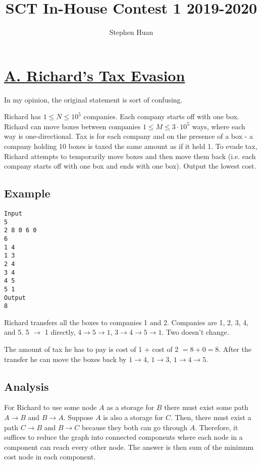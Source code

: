\documentclass[11pt, oneside]{article}
\title{SCT In-House Contest 1 2019-2020}
\author{Stephen Huan}
\begin{document}
\maketitle

\section{\href{https://codeforces.com/group/M4wsRWBHyZ/contest/259141/problem/A}{A. Richard's Tax Evasion}}
In my opinion, the original statement is sort of confusing.

Richard has \( 1 \leq N \leq 10^5 \) companies. Each company starts off with one box.
Richard can move boxes between companies \( 1 \leq M \leq 3 \cdot 10^5 \) ways, where each way is one-directional.
Tax is for each company and on the presence of a box - a company holding 10 boxes is taxed the same amount
as if it held 1. To evade tax, Richard attempts to temporarily move boxes and then move them back (i.e. each company starts off with one box and ends with one box). Output the lowest cost.

\subsection{Example}
\begin{verbatim}
Input
5
2 8 0 6 0
6
1 4
1 3
2 4
3 4
4 5
5 1
Output
8
\end{verbatim}

Richard transfers all the boxes to companies 1 and 2.
Companies are 1, 2, 3, 4, and 5.
5 \( \rightarrow \) 1 directly, \( 4 \rightarrow 5 \rightarrow 1 \),
\( 3 \rightarrow 4 \rightarrow 5 \rightarrow 1 \). Two doesn't change.

The amount of tax he has to pay is cost of 1 + cost of 2 \( = 8 + 0 = 8 \).
After the transfer he can move the boxes back by \( 1 \rightarrow 4 \),
\( 1 \rightarrow 3 \), \( 1 \rightarrow 4 \rightarrow 5 \).

\subsection{Analysis}

For Richard to use some node \( A \) as a storage for \( B \) there must exist some
path \( A \rightarrow B \) and \( B \rightarrow A \). Suppose \( A \) is also a storage
for \( C \). Then, there must exist a path \( C \rightarrow B \) and \( B \rightarrow C \)
because they both can go through \( A \). Therefore, it suffices to reduce the graph into connected components
where each node in a component can reach every other node. The answer is then sum of the minimum cost
node in each component.
\end{document}
